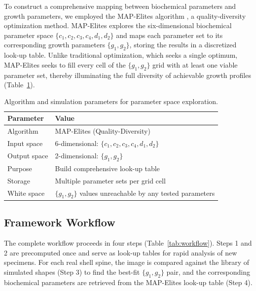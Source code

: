 \documentclass[11pt]{article}
\begin{document}
To construct a comprehensive mapping between biochemical parameters and growth parameters, we employed the MAP-Elites algorithm \citep{mouret2015,fontana2021}, a quality-diversity optimization method. MAP-Elites explores the six-dimensional biochemical parameter space $\{c_1, c_2, c_3, c_4, d_1, d_2\}$ and maps each parameter set to its corresponding growth parameters $\{g_1, g_2\}$, storing the results in a discretized look-up table. Unlike traditional optimization, which seeks a single optimum, MAP-Elites seeks to fill every cell of the $\{g_1, g_2\}$ grid with at least one viable parameter set, thereby illuminating the full diversity of achievable growth profiles (Table~\ref{tab:algorithm}).

\begin{table}[htbp]
\centering
\caption{Algorithm and simulation parameters for parameter space exploration.}
\label{tab:algorithm}
\begin{tabular}{ll}
\toprule
\textbf{Parameter} & \textbf{Value} \\
\midrule
Algorithm & MAP-Elites (Quality-Diversity) \\
Input space & 6-dimensional: $\{c_1, c_2, c_3, c_4, d_1, d_2\}$ \\
Output space & 2-dimensional: $\{g_1, g_2\}$ \\
Purpose & Build comprehensive look-up table \\
Storage & Multiple parameter sets per grid cell \\
White space & $\{g_1, g_2\}$ values unreachable by any tested parameters \\
\bottomrule
\end{tabular}
\end{table}

\subsection{Framework Workflow}

The complete workflow proceeds in four steps (Table~\ref{tab:workflow}). Steps 1 and 2 are precomputed once and serve as look-up tables for rapid analysis of new specimens. For each real shell spine, the image is compared against the library of simulated shapes (Step 3) to find the best-fit $\{g_1, g_2\}$ pair, and the corresponding biochemical parameters are retrieved from the MAP-Elites look-up table (Step 4).
\end{document}
